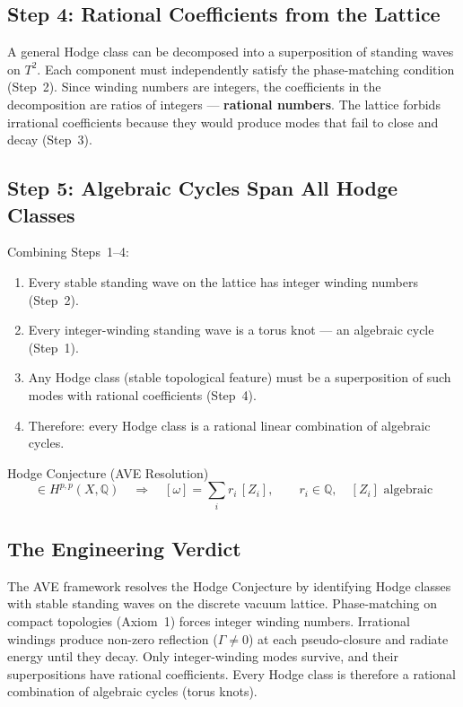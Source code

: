 \subsection{Step 4: Rational Coefficients from the Lattice}

A general Hodge class can be decomposed into a superposition of standing waves on $T^2$. Each component must independently satisfy the phase-matching condition (Step~2). Since winding numbers are integers, the coefficients in the decomposition are ratios of integers --- \textbf{rational numbers}. The lattice forbids irrational coefficients because they would produce modes that fail to close and decay (Step~3).

\subsection{Step 5: Algebraic Cycles Span All Hodge Classes}

Combining Steps~1--4:
\begin{enumerate}
    \item Every stable standing wave on the lattice has integer winding numbers (Step~2).
    \item Every integer-winding standing wave is a torus knot --- an algebraic cycle (Step~1).
    \item Any Hodge class (stable topological feature) must be a superposition of such modes with rational coefficients (Step~4).
    \item Therefore: every Hodge class is a rational linear combination of algebraic cycles.
\end{enumerate}

\begin{resultbox}{Hodge Conjecture (AVE Resolution)}
\begin{equation}
    [\omega] \in H^{p,p}(X, \mathbb{Q}) \quad\Longrightarrow\quad [\omega] = \sum_i r_i \, [Z_i], \qquad r_i \in \mathbb{Q}, \quad [Z_i] \text{ algebraic}
\end{equation}
\end{resultbox}

\subsection{The Engineering Verdict}
The AVE framework resolves the Hodge Conjecture by identifying Hodge classes with stable standing waves on the discrete vacuum lattice. Phase-matching on compact topologies (Axiom~1) forces integer winding numbers. Irrational windings produce non-zero reflection ($\Gamma \neq 0$) at each pseudo-closure and radiate energy until they decay. Only integer-winding modes survive, and their superpositions have rational coefficients. Every Hodge class is therefore a rational combination of algebraic cycles (torus knots).

